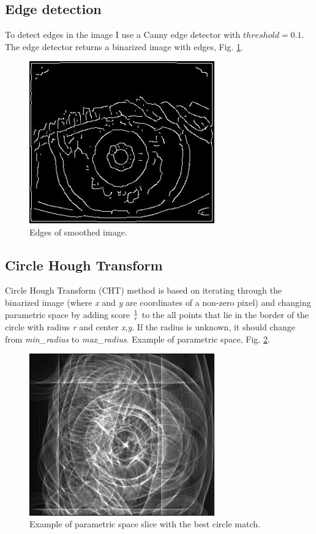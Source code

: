 \documentclass{article}
\begin{document}
\subsection{Edge detection}
To detect edges in the image I use a Canny edge detector with \(threshold = 0.1\).
The edge detector returns a binarized image with edges, Fig. \ref{ImgEdge}.

\begin{figure}[ht!]
  \centering
  \includegraphics[width=80mm]{Resources/eye-ImgEdge.jpg}
  \caption{Edges of smoothed image.}
  \label{ImgEdge}
\end{figure}

\subsection{Circle Hough Transform}
Circle Hough Transform (CHT) method is based on iterating through the binarized image (where \textit{x} and \textit{y} are coordinates of a non-zero pixel)
and changing parametric space by adding score \(1 \over r \) to the all points that lie in the border of the circle with radius \textit{r} and center \textit{x},\textit{y}.
If the radius is unknown, it should change from \textit{min\_radius} to \textit{max\_radius}.
Example of parametric space, Fig. \ref{abspace}.

\begin{figure}[ht!]
  \centering
  \includegraphics[width=80mm]{Resources/eye-abspace.jpg}
  \caption{Example of parametric space slice with the best circle match.}
  \label{abspace}
\end{figure}
\end{document}
